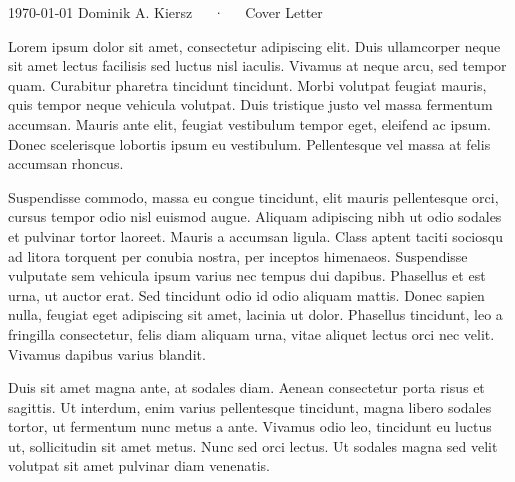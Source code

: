 \documentclass[11pt, a4paper]{awesome-cv-mod}
\begin{document}
\makecvheader[R]

\makecvfooter
  {\today}
  {Dominik A. Kiersz~~~·~~~Cover Letter}
  {}

\makelettertitle


\begin{cvletter}

Lorem ipsum dolor sit amet, consectetur adipiscing elit. Duis ullamcorper neque sit amet lectus facilisis sed luctus nisl iaculis. Vivamus at neque arcu, sed tempor quam. Curabitur pharetra tincidunt tincidunt. Morbi volutpat feugiat mauris, quis tempor neque vehicula volutpat. Duis tristique justo vel massa fermentum accumsan. Mauris ante elit, feugiat vestibulum tempor eget, eleifend ac ipsum. Donec scelerisque lobortis ipsum eu vestibulum. Pellentesque vel massa at felis accumsan rhoncus.

Suspendisse commodo, massa eu congue tincidunt, elit mauris pellentesque orci, cursus tempor odio nisl euismod augue. Aliquam adipiscing nibh ut odio sodales et pulvinar tortor laoreet. Mauris a accumsan ligula. Class aptent taciti sociosqu ad litora torquent per conubia nostra, per inceptos himenaeos. Suspendisse vulputate sem vehicula ipsum varius nec tempus dui dapibus. Phasellus et est urna, ut auctor erat. Sed tincidunt odio id odio aliquam mattis. Donec sapien nulla, feugiat eget adipiscing sit amet, lacinia ut dolor. Phasellus tincidunt, leo a fringilla consectetur, felis diam aliquam urna, vitae aliquet lectus orci nec velit. Vivamus dapibus varius blandit.

Duis sit amet magna ante, at sodales diam. Aenean consectetur porta risus et sagittis. Ut interdum, enim varius pellentesque tincidunt, magna libero sodales tortor, ut fermentum nunc metus a ante. Vivamus odio leo, tincidunt eu luctus ut, sollicitudin sit amet metus. Nunc sed orci lectus. Ut sodales magna sed velit volutpat sit amet pulvinar diam venenatis.

\end{cvletter}

\makeletterclosing
\end{document}

